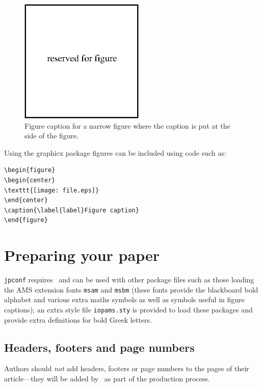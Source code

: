 \documentclass[a4paper]{jpconf}
\begin{document}
\begin{figure}[h]
\includegraphics[width=14pc]{name.eps}\hspace{2pc}%
\begin{minipage}[b]{14pc}\caption{\label{label}Figure caption for a narrow figure where the caption is 
put at the side of the figure.}
\end{minipage}
\end{figure}

Using the graphicx package figures can be included using code such as:
\begin{verbatim}
\begin{figure}
\begin{center}
\texttt{[image: file.eps]}
\end{center}
\caption{\label{label}Figure caption}
\end{figure}
\end{verbatim}


\section{Preparing your paper}
\verb"jpconf" requires \LaTeXe\ and  can be used with other package files such
as those loading the AMS extension fonts 
\verb"msam" and \verb"msbm" (these fonts provide the 
blackboard bold alphabet and various extra maths symbols as well as 
symbols useful in figure captions); an extra style file \verb"iopams.sty" is 
provided to load these packages and provide extra definitions for bold Greek letters. 
\subsection{Headers, footers and page numbers}
Authors should {\it not} add headers, footers or page numbers to the pages of their article---they will
be added by \iopp\ as part of the production process.
\end{document}
